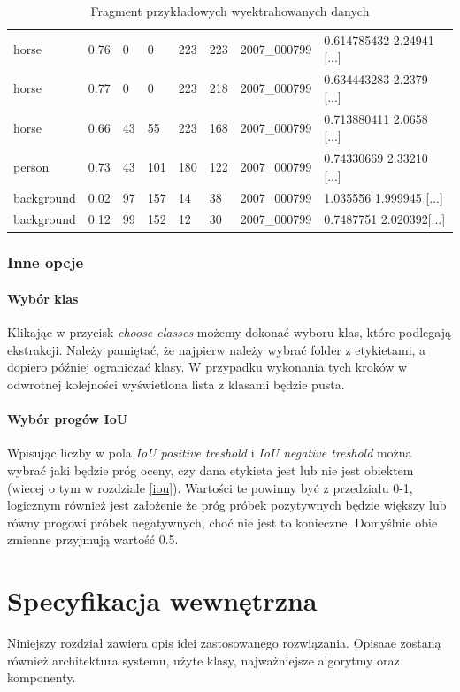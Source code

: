 \documentclass[a4paper,twoside,12pt]{book}
\begin{document}
{\begin{table}[h!]
\centering
\caption{Fragment przykładowych wyektrahowanych danych}
\begin{tabular}{|l|l|l|l|l|l|l|l|}
horse & 0.76 & 0 & 0 & 223 & 223 & 2007\_000799 & 0.614785432 2.24941 [...]\\
horse & 0.77 &0 & 0 & 223 & 218 & 2007\_000799 &  0.634443283 2.2379 [...]\\
horse &  0.66 &43 & 55 & 223 & 168 & 2007\_000799 & 0.713880411 2.0658 [...]\\
person & 0.73 & 43 & 101 & 180 & 122 & 2007\_000799 & 0.74330669 2.33210 [...] \\
background & 0.02 & 97 & 157 & 14 & 38 & 2007\_000799 & 1.035556 1.999945 [...]\\
background & 0.12 &99 & 152 & 12 & 30 & 2007\_000799 & 0.7487751 2.020392[...]\\
\end{tabular}
\label{cechy}
\end{table}

\subsection{Inne opcje}
\subsubsection{Wybór klas}
{Klikając w przycisk \emph{choose classes} możemy dokonać wyboru klas, które podlegają ekstrakcji. Należy pamiętać, że najpierw należy wybrać folder z etykietami, a dopiero później ograniczać klasy. W przypadku wykonania tych kroków w odwrotnej kolejności wyświetlona lista z klasami będzie pusta.}
\subsubsection{Wybór progów IoU}
{Wpisując liczby w pola \emph{IoU positive treshold} i \emph{IoU negative treshold} można wybrać jaki będzie próg oceny, czy dana etykieta jest lub nie jest obiektem (wiecej o tym w rozdziale \ref{iou}). Wartości te powinny być z przedziału 0-1, logicznym również jest założenie że próg próbek pozytywnych będzie większy lub równy progowi próbek negatywnych, choć nie jest to konieczne. Domyślnie obie zmienne przyjmują wartość 0.5.}


 

\chapter{Specyfikacja wewnętrzna}
{Niniejszy rozdział zawiera opis idei zastosowanego rozwiązania. Opisaae zostaną również architektura systemu, użyte klasy, najważniejsze algorytmy oraz komponenty.}
}
\end{document}
